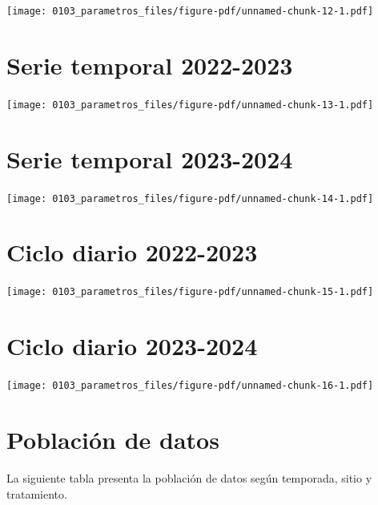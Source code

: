 \documentclass[
  letterpaper,
  DIV=11,
  numbers=noendperiod]{scrreprt}
\begin{document}
\begin{center}
\texttt{[image: 0103\_parametros\_files/figure-pdf/unnamed-chunk-12-1.pdf]}
\end{center}

\chapter{Serie temporal 2022-2023}

\begin{center}
\texttt{[image: 0103\_parametros\_files/figure-pdf/unnamed-chunk-13-1.pdf]}
\end{center}

\chapter{Serie temporal 2023-2024}

\begin{center}
\texttt{[image: 0103\_parametros\_files/figure-pdf/unnamed-chunk-14-1.pdf]}
\end{center}

\chapter{Ciclo diario 2022-2023}

\begin{center}
\texttt{[image: 0103\_parametros\_files/figure-pdf/unnamed-chunk-15-1.pdf]}
\end{center}

\chapter{Ciclo diario 2023-2024}

\begin{center}
\texttt{[image: 0103\_parametros\_files/figure-pdf/unnamed-chunk-16-1.pdf]}
\end{center}

\chapter{Población de datos}

La siguiente tabla presenta la población de datos según temporada, sitio
y tratamiento.
\end{document}
